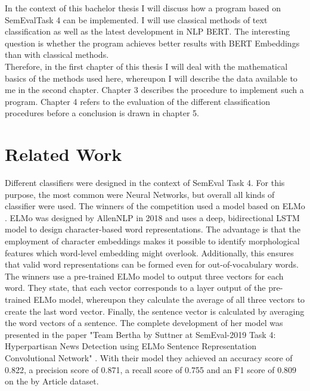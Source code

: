 \documentclass[a4paper, 11pt,titlepage,oneside,openany]{book}
\begin{document}
\indent In the context of this bachelor thesis I will discuss how a program based on SemEvalTask 4 can be implemented. I will use classical methods of text classification as well as the latest development in NLP BERT. The interesting question is whether the program achieves better results with BERT Embeddings than with classical methods. \\
Therefore, in the first chapter of this thesis I will deal with the mathematical basics of the methods used here, whereupon I will describe the data available to me in the second chapter. Chapter 3 describes the procedure to implement such a program. Chapter 4 refers to the evaluation of the different classification procedures before a conclusion is drawn in chapter 5. 

\chapter{Related Work}
Different classifiers were designed in the context of SemEval Task 4. For this purpose, the most common were Neural Networks, but overall all kinds of classifier were used. The winners of the competition used a model based on ELMo \cite{elmo}. ELMo was designed by AllenNLP in 2018 and uses a deep, bidirectional LSTM model to design character-based word representations. The advantage is that the employment of character embeddings makes it possible to identify morphological features which word-level embedding might overlook. Additionally, this ensures that valid word representations can be formed even for out-of-vocabulary words. The winners use a pre-trained ELMo model to output three vectors for each word. They state, that each vector corresponds to a layer output of the pre-trained ELMo model, whereupon they calculate the average of all three vectors to create the last word vector. Finally, the sentence vector is calculated by averaging the word vectors of a sentence. The complete development of her model was presented in the paper "Team Bertha by Suttner at SemEval-2019 Task 4: Hyperpartisan News Detection using ELMo Sentence Representation Convolutional Network" \cite{gewinner}. With their model they achieved an accuracy score of 0.822, a precision score of 0.871, a recall score of 0.755 and an F1 score of 0.809 on the by Article dataset. \\
\end{document}

